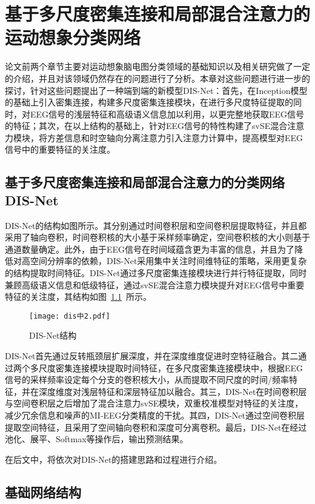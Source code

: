 \chapter{基于多尺度密集连接和局部混合注意力的运动想象分类网络}

论文前两个章节主要对运动想象脑电图分类领域的基础知识以及相关研究做了一定的介绍，并且对该领域仍然存在的问题进行了分析。本章对这些问题进行进一步的探讨，针对这些问题提出了一种端到端的新模型DIS-Net：首先，在Inception模型的基础上引入密集连接，构建多尺度密集连接模块，在进行多尺度特征提取的同时，对EEG信号的浅层特征和高级语义信息加以利用，以更完整地获取EEG信号的特征；其次，在以上结构的基础上，针对EEG信号的特性构建了svSE混合注意力模块，将方差信息和时空轴向分离注意力引入注意力计算中，提高模型对EEG信号中的重要特征的关注度。

\section{基于多尺度密集连接和局部混合注意力的分类网络DIS-Net}

DIS-Net的结构如图所示。其分别通过时间卷积层和空间卷积层提取特征，并且都采用了轴向卷积，时间卷积核的大小基于采样频率确定，空间卷积核的大小则基于通道数量确定。此外，由于EEG信号在时间域蕴含更为丰富的信息，并且为了降低对高空间分辨率的依赖，DIS-Net采用集中关注时间维特征的策略，采用更复杂的结构提取时间特征。DIS-Net通过多尺度密集连接模块进行并行特征提取，同时兼顾高级语义信息和低级特征，通过svSE混合注意力模块提升对EEG信号中重要特征的关注度，其结构如图~\ref{fig:dis}~所示。

\begin{figure}[ht]
  \centering
  \texttt{[image: dis中2.pdf]}
  \caption{DIS-Net结构}
  \label{fig:dis}
\end{figure}

DIS-Net首先通过反转瓶颈层扩展深度，并在深度维度促进时空特征融合。其二通过两个多尺度密集连接模块提取时间特征，在多尺度密集连接模块中，根据EEG信号的采样频率设定每个分支的卷积核大小，从而提取不同尺度的时间/频率特征，并在深度维度对浅层特征和深层特征加以融合。其三，DIS-Net在时间卷积层与空间卷积层之后增加了混合注意力svSE模块，双重校准模型对特征的关注度，减少冗余信息和噪声的MI-EEG分类精度的干扰。其四，DIS-Net通过空间卷积层提取空间特征，且采用了空间轴向卷积和深度可分离卷积。最后，DIS-Net在经过池化、展平、Softmax等操作后，输出预测结果。

在后文中，将依次对DIS-Net的搭建思路和过程进行介绍。

\section{基础网络结构}

